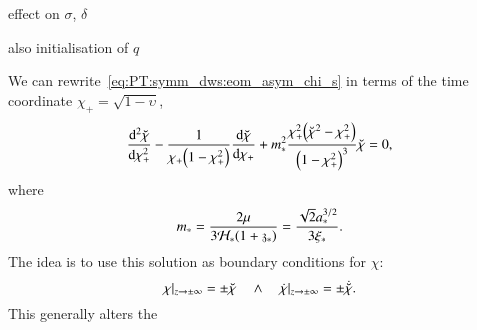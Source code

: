 






 
\begin{bullets}
    \item effect on $\sigma$, $\delta$
    \item also initialisation of $q$
\end{bullets}



We can rewrite~\cref{eq:PT:symm_dws:eom_asym_chi_s} in terms of the time coordinate $\chi_+ =\sqrt{1-\upsilon}$,
\begin{equation}%
    \dv[2]{\brchi}{\chi_+} - \frac{1}{\chi_+ \pclosed{1-\chi_+^2}} \dv{\brchi}{\chi_+} + m_\ast^2 \frac{\chi_+^2 \pclosed{\brchi^2-\chi_+^2}}{\pclosed{1-\chi_+^2}^3}\brchi = 0,
\end{equation}
where
\begin{equation}%
    m_\ast= \frac{2\mu}{3\mathcal{H}_\ast \pclosed{1+\redshift_\ast}} = \frac{\sqrt{2}a_\ast^{3/2}}{3\xi_\ast}.
\end{equation}
The idea is to use this solution as boundary conditions for $\chi$:
\begin{equation}
    \chi|_{z\to \pm\infty} =\pm \breve{\chi} \quad \land \quad \dot{\chi}|_{z\to \pm\infty} =\pm \dot{\breve{\chi}}.
\end{equation}
This generally alters the \blahblah
{}

